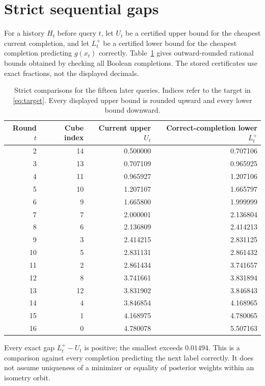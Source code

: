 \documentclass[11pt]{article}
\theoremstyle{remark}\newtheorem{remark}[theorem]{Remark}
\newcommand{\1}{\mathbf 1}
\begin{document}
\section{Strict sequential gaps}\label{sec:sequence}
For a history $H_t$ before query $t$, let $U_t$ be a certified upper bound for the cheapest current completion, and let $L_t^+$ be a certified lower bound for the cheapest completion predicting $g(x_t)$ correctly. Table~\ref{tab:gaps} gives outward-rounded rational bounds obtained by checking all Boolean completions. The stored certificates use exact fractions, not the displayed decimals.

\begin{table}[ht]
\centering
\caption{Strict comparisons for the fifteen later queries. Indices refer to the target in \eqref{eq:target}. Every displayed upper bound is rounded upward and every lower bound downward.}\label{tab:gaps}
\begin{tabular}{rrrr}
\toprule
Round $t$&Cube index&Current upper $U_t$&Correct-completion lower $L_t^+$\\\midrule
2 & 14 & 0.500000 & 0.707106 \\
3 & 13 & 0.707109 & 0.965925 \\
4 & 11 & 0.965927 & 1.207106 \\
5 & 10 & 1.207107 & 1.665797 \\
6 & 9 & 1.665800 & 1.999999 \\
7 & 7 & 2.000001 & 2.136804 \\
8 & 6 & 2.136809 & 2.414213 \\
9 & 3 & 2.414215 & 2.831125 \\
10 & 5 & 2.831131 & 2.861432 \\
11 & 2 & 2.861434 & 3.741657 \\
12 & 8 & 3.741661 & 3.831894 \\
13 & 12 & 3.831902 & 3.846843 \\
14 & 4 & 3.846854 & 4.168965 \\
15 & 1 & 4.168975 & 4.780065 \\
16 & 0 & 4.780078 & 5.507163 \\
\bottomrule
\end{tabular}
\end{table}

Every exact gap $L_t^+-U_t$ is positive; the smallest exceeds $0.01494$. This is a comparison against every completion predicting the next label correctly. It does not assume uniqueness of a minimizer or equality of posterior weights within an isometry orbit.
\end{document}
